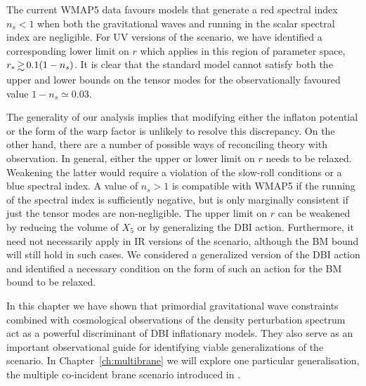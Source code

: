The current WMAP5 data 
favours models that generate a red spectral index $n_s<1$
when both the gravitational waves and running in the scalar 
spectral index are negligible. For UV versions of the scenario, 
we have identified a corresponding 
lower limit on $r$ which applies in this region of 
parameter space, $r_* \, \gsim \, 0.1 (1-n_s)$. It is clear that 
the standard model 
cannot satisfy both the upper and lower bounds 
on the tensor modes for the observationally favoured value 
$1-n_s \simeq 0.03$.


The generality of our 
analysis implies that modifying either the inflaton potential 
or the form of the warp factor is unlikely to resolve this discrepancy. 
On the other hand, there are a number of possible ways of reconciling  
theory with observation. In general, 
either the upper or lower limit on $r$ needs to be relaxed. 
Weakening the latter would require a violation of the slow-roll 
conditions or a blue spectral index. 
A value of $n_s >1$ is compatible with WMAP5 if the running of the 
spectral index 
is sufficiently negative, but is only marginally
consistent if just the tensor modes are non-negligible.  The 
upper limit on $r$ can be weakened by reducing 
the volume of $X_5$ or 
by generalizing the DBI action. Furthermore, it need not necessarily 
apply in IR versions of the scenario, although the BM bound will still hold
in such cases. 
We considered a generalized version of the 
DBI action and identified a necessary condition on the form of such  
an action for the BM bound to be relaxed.






In this chapter we have shown that primordial gravitational wave constraints 
combined with cosmological observations of the density perturbation
spectrum act as a powerful discriminant of DBI inflationary models. 
They also serve as an important observational guide for identifying viable 
generalizations of the scenario. In Chapter~\ref{ch:multibrane} we will explore
one particular generalisation, the multiple co-incident brane scenario
introduced in .
